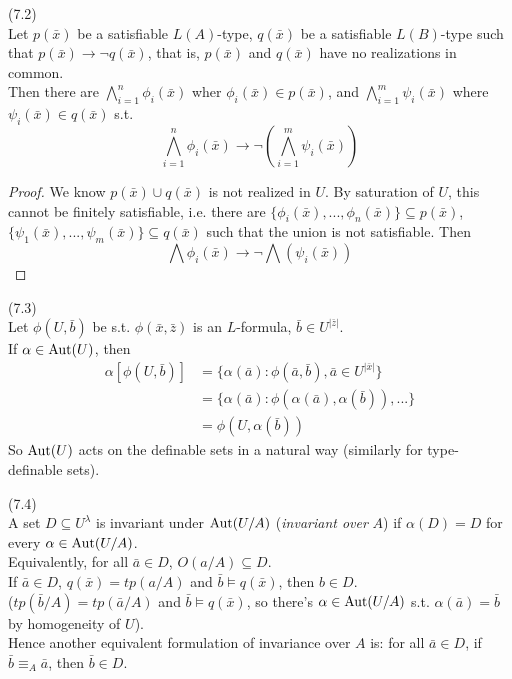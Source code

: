 \documentclass[a4paper]{article}
\begin{document}
\begin{fact} (7.2)\\
    Let $p(\bar{x})$ be a satisfiable $L(A)$-type, $q(\bar{x})$ be a satisfiable $L(B)$-type such that $p(\bar{x}) \to \neg q(\bar{x})$, that is, $p(\bar{x})$ and $q(\bar{x})$ have no realizations in common.\\
    Then there are $\bigwedge_{i=1}^n \phi_i(\bar{x})$ wher $\phi_i(\bar{x}) \in p(\bar{x})$, and $\bigwedge_{i=1}^m \psi_i(\bar{x})$ where $\psi_i(\bar{x}) \in q(\bar{x})$ s.t.
    $$\bigwedge_{i=1}^n \phi_i(\bar{x}) \to \neg (\bigwedge_{i=1}^m \psi_i(\bar{x}))$$
    \begin{proof}
        We know $p(\bar{x}) \cup q(\bar{x})$ is not realized in $U$. By saturation of $U$, this cannot be finitely satisfiable, i.e. there are $\{\phi_i(\bar{x}),...,\phi_n(\bar{x})\} \subseteq p(\bar{x})$, $\{\psi_1(\bar{x}),...,\psi_m(\bar{x})\} \subseteq q(\bar{x})$ such that the union is not satisfiable. Then 
        $$\bigwedge \phi_i(\bar{x}) \to \neg \bigwedge (\psi_i(\bar{x}))$$
    \end{proof}
\end{fact}

\begin{rem} (7.3)\\
    Let $\phi(U,\bar{b})$ be s.t. $\phi(\bar{x},\bar{z})$ is an $L$-formula, $\bar{b} \in U^{|\bar{z}|}$.\\
    If $\alpha \in \operatorname{Aut}(U)$, then
    \begin{equation*}
        \begin{aligned}
            \alpha[\phi(U,\bar{b})] &= \{\alpha(\bar{a}): \phi(\bar{a},\bar{b}),\bar{a} \in U^{|\bar{x}|}\}\\
            &= \{\alpha(\bar{a}):\phi(\alpha(\bar{a}),\alpha(\bar{b})),...\}\\
            &= \phi(U,\alpha(\bar{b}))
        \end{aligned}
    \end{equation*}
    So $\operatorname{Aut}(U)$ acts on the definable sets in a natural way (similarly for type-definable sets).
\end{rem}

\begin{defi} (7.4)\\
    A set $D \subseteq U^\lambda$ is invariant under $\operatorname{Aut}(U/A)$ (\emph{invariant over} $A$) if $\alpha(D) = D$ for every $\alpha \in \operatorname{Aut}(U/A)$.\\
    Equivalently, for all $\bar{a} \in D$, $O(a/A) \subseteq D$.\\
    If $\bar{a} \in D$, $q(\bar{x}) = tp(a/A)$ and $\bar{b} \vDash q(\bar{x})$, then $b \in D$.\\
    ($tp(\bar{b}/A) = tp(\bar{a}/A)$ and $\bar{b} \vDash q(\bar{x})$, so there's $\alpha \in \operatorname{Aut}(U/A)$ s.t. $\alpha(\bar{a}) = \bar{b}$ by homogeneity of $U$).\\
    Hence another equivalent formulation of invariance over $A$ is: for all $\bar{a} \in D$, if $\bar{b} \equiv_A \bar{a}$, then $\bar{b} \in D$.
\end{defi}
\end{document}
